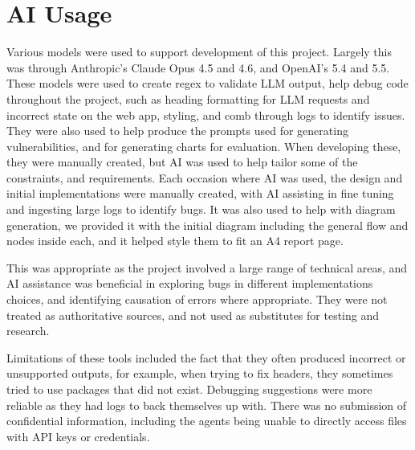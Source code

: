 %


\section{AI Usage}\label{sec:ai-usage}

Various models were used to support development of this project. Largely this was through Anthropic's Claude Opus 4.5 and 4.6, and OpenAI's 5.4 and 5.5. These models were used to create regex to validate LLM output, help debug code throughout the project, such as heading formatting for LLM requests and incorrect state on the web app, styling, and comb through logs to identify issues. They were also used to help produce the prompts used for generating vulnerabilities, and for generating charts for evaluation. When developing these, they were manually created, but AI was used to help tailor some of the constraints, and requirements. Each occasion where AI was used, the design and initial implementations were manually created, with AI assisting in fine tuning and ingesting large logs to identify bugs. It was also used to help with diagram generation, we provided it with the initial diagram including the general flow and nodes inside each, and it helped style them to fit an A4 report page.

This was appropriate as the project involved a large range of technical areas, and AI assistance was beneficial in exploring bugs in different implementations choices, and identifying causation of errors where appropriate. They were not treated as authoritative sources, and not used as substitutes for testing and research.

Limitations of these tools included the fact that they often produced incorrect or unsupported outputs, for example, when trying to fix headers, they sometimes tried to use packages that did not exist. Debugging suggestions were more reliable as they had logs to back themselves up with. There was no submission of confidential information, including the agents being unable to directly access files with API keys or credentials.
